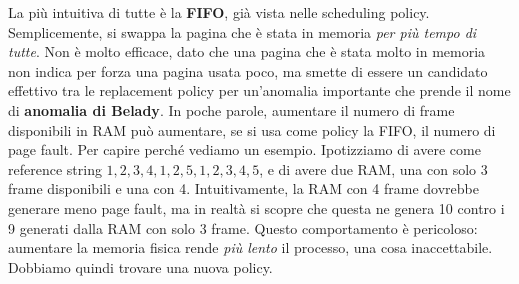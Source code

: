 \documentclass[11pt, a4paper, titlepage, oneside]{scrbook}
\begin{document}
La più intuitiva di tutte è la \textbf{FIFO}, già vista nelle scheduling policy. Semplicemente, si swappa la pagina che è stata in memoria \textit{per più tempo di tutte}. Non è molto efficace, dato che una pagina che è stata molto in memoria non indica per forza una pagina usata poco, ma smette di essere un candidato effettivo tra le replacement policy per un'anomalia importante che prende il nome di \textbf{anomalia di Belady}. In poche parole, aumentare il numero di frame disponibili in RAM può aumentare, se si usa come policy la FIFO, il numero di page fault. Per capire perché vediamo un esempio. Ipotizziamo di avere come reference string $1,2,3,4,1,2,5,1,2,3,4,5$, e di avere due RAM, una con solo 3 frame disponibili e una con 4. Intuitivamente, la RAM con 4 frame dovrebbe generare meno page fault, ma in realtà si scopre che questa ne genera 10 contro i 9 generati dalla RAM con solo 3 frame. Questo comportamento è pericoloso: aumentare la memoria fisica rende \textit{più lento} il processo, una cosa inaccettabile. Dobbiamo quindi trovare una nuova policy. 
\end{document}
